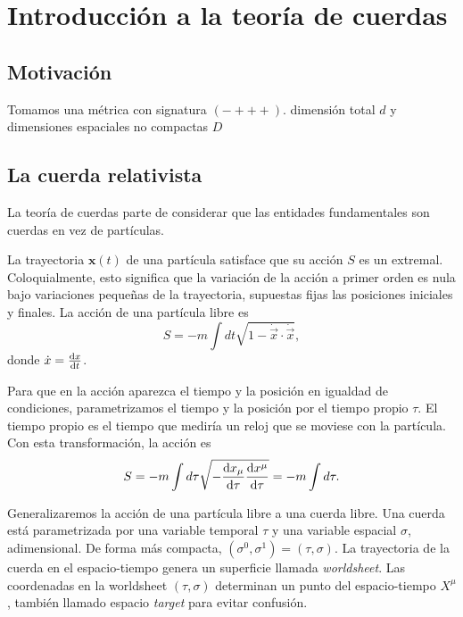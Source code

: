 \chapter{Introducción a la teoría de cuerdas}


\section{Motivación}




Tomamos una métrica con signatura $(-+++)$.
dimensión total $d$ y dimensiones espaciales no compactas $D$

\section{La cuerda relativista}


La teoría de cuerdas parte de considerar que las entidades fundamentales son cuerdas
en vez de partículas. 

La trayectoria $\mathbf x(t)$ de una partícula satisface que su acción $S$ es un extremal.
Coloquialmente, esto significa que la variación de la acción a primer orden es nula bajo
variaciones pequeñas de la trayectoria, supuestas fijas las posiciones iniciales y finales.
La acción de una partícula libre es
\begin{equation}
  S=-m\int dt \sqrt{1-\dot {\vec{x}} \cdot \dot {\vec{x}}},
\end{equation}
donde $\dot x = \dv{x}{t}$.

Para que en la acción aparezca el tiempo y la posición en igualdad de condiciones,
parametrizamos el tiempo y la posición por el tiempo propio $\tau$. 
El tiempo propio es el tiempo que mediría un reloj que se moviese con la partícula.
Con esta transformación, la acción es
\begin{equation}
 S = -m\int d\tau \sqrt{-\dv{x_\mu}{\tau}\dv{x^\mu}{\tau}}=-m\int d\tau .
\end{equation}

Generalizaremos la acción de una partícula libre a una cuerda libre.
Una cuerda está parametrizada por una variable temporal $\tau$ y una variable espacial $\sigma$, adimensional.
De forma más compacta, $(\sigma^0,\sigma^1)=(\tau,\sigma)$. 
La trayectoria de la cuerda en el espacio-tiempo genera un superficie llamada \emph{worldsheet}.
Las coordenadas en la worldsheet $(\tau,\sigma)$ determinan un punto del espacio-tiempo $X^\mu$, también llamado
espacio \emph{target} para evitar confusión.

